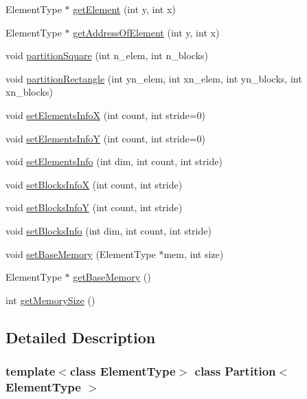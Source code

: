 \begin{DoxyCompactItemize}
ElementType $\ast$ \hyperlink{class_partition_a541241fa1ca1de2c82a43612e9774f00}{getElement} (int y, int x)
\item 
ElementType $\ast$ \hyperlink{class_partition_a3866b3ab8d6e114eb0835465f7418ceb}{getAddressOfElement} (int y, int x)
\item 
void \hyperlink{class_partition_a617c37139285d3b510144eb206a15549}{partitionSquare} (int n\_\-elem, int n\_\-blocks)
\item 
void \hyperlink{class_partition_a5ca98c67580ef12ca1b2376638fb9714}{partitionRectangle} (int yn\_\-elem, int xn\_\-elem, int yn\_\-blocks, int xn\_\-blocks)
\item 
void \hyperlink{class_partition_a645aef56ca3bc0e0d059e9efb0301f97}{setElementsInfoX} (int count, int stride=0)
\item 
void \hyperlink{class_partition_a67f73cecff570475924b28cad0a77e6c}{setElementsInfoY} (int count, int stride=0)
\item 
void \hyperlink{class_partition_aa5dc8e134f02dadb839fa5cf50506ec0}{setElementsInfo} (int dim, int count, int stride)
\item 
void \hyperlink{class_partition_ad974cd0110425d8c8975908953847d61}{setBlocksInfoX} (int count, int stride)
\item 
void \hyperlink{class_partition_a6b287b25306db5bd66df1dc1a55ba6a0}{setBlocksInfoY} (int count, int stride)
\item 
void \hyperlink{class_partition_a96a9021fbce8a82ff167ec8cffa5d9d2}{setBlocksInfo} (int dim, int count, int stride)
\item 
void \hyperlink{class_partition_a8ca97963e7769bec5e7c59f9e4660427}{setBaseMemory} (ElementType $\ast$mem, int size)
\item 
ElementType $\ast$ \hyperlink{class_partition_a09cdb296f21b866f576556e0b7d5c85b}{getBaseMemory} ()
\item 
int \hyperlink{class_partition_a38b3de8d91758c1b15082601d949bb85}{getMemorySize} ()
\end{DoxyCompactItemize}


\subsection{Detailed Description}
\subsubsection*{template$<$class ElementType$>$ class Partition$<$ ElementType $>$}



